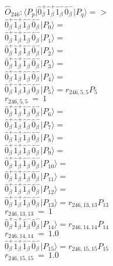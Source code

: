 \documentclass[14pt]{article}
\begin{document}
    $\hat{O}_{246}:  \langle{P_p}\vert \hat{0}_{\beta}^{+}\hat{1}_{\beta}^{+}\hat{1}_{\beta}^{-}\hat{0}_{\beta}^{-} \vert{P_q}\rangle => $ \\ 
    $ \hat{0}_{\beta}^{+}\hat{1}_{\beta}^{+}\hat{1}_{\beta}^{-}\hat{0}_{\beta}^{-} \vert{P_{0}}\rangle =  $ \\ 
    $ \hat{0}_{\beta}^{+}\hat{1}_{\beta}^{+}\hat{1}_{\beta}^{-}\hat{0}_{\beta}^{-} \vert{P_{1}}\rangle =  $ \\ 
    $ \hat{0}_{\beta}^{+}\hat{1}_{\beta}^{+}\hat{1}_{\beta}^{-}\hat{0}_{\beta}^{-} \vert{P_{2}}\rangle =  $ \\ 
    $ \hat{0}_{\beta}^{+}\hat{1}_{\beta}^{+}\hat{1}_{\beta}^{-}\hat{0}_{\beta}^{-} \vert{P_{3}}\rangle =  $ \\ 
    $ \hat{0}_{\beta}^{+}\hat{1}_{\beta}^{+}\hat{1}_{\beta}^{-}\hat{0}_{\beta}^{-} \vert{P_{4}}\rangle =  $ \\ 
    $ \hat{0}_{\beta}^{+}\hat{1}_{\beta}^{+}\hat{1}_{\beta}^{-}\hat{0}_{\beta}^{-} \vert{P_{5}}\rangle = {r}_{246,5,5}P_{5} $ \\ 
    ${r}_{246,5,5}\ =\ 1 $ \\ 
    $ \hat{0}_{\beta}^{+}\hat{1}_{\beta}^{+}\hat{1}_{\beta}^{-}\hat{0}_{\beta}^{-} \vert{P_{6}}\rangle =  $ \\ 
    $ \hat{0}_{\beta}^{+}\hat{1}_{\beta}^{+}\hat{1}_{\beta}^{-}\hat{0}_{\beta}^{-} \vert{P_{7}}\rangle =  $ \\ 
    $ \hat{0}_{\beta}^{+}\hat{1}_{\beta}^{+}\hat{1}_{\beta}^{-}\hat{0}_{\beta}^{-} \vert{P_{8}}\rangle =  $ \\ 
    $ \hat{0}_{\beta}^{+}\hat{1}_{\beta}^{+}\hat{1}_{\beta}^{-}\hat{0}_{\beta}^{-} \vert{P_{9}}\rangle =  $ \\ 
    $ \hat{0}_{\beta}^{+}\hat{1}_{\beta}^{+}\hat{1}_{\beta}^{-}\hat{0}_{\beta}^{-} \vert{P_{10}}\rangle =  $ \\ 
    $ \hat{0}_{\beta}^{+}\hat{1}_{\beta}^{+}\hat{1}_{\beta}^{-}\hat{0}_{\beta}^{-} \vert{P_{11}}\rangle =  $ \\ 
    $ \hat{0}_{\beta}^{+}\hat{1}_{\beta}^{+}\hat{1}_{\beta}^{-}\hat{0}_{\beta}^{-} \vert{P_{12}}\rangle =  $ \\ 
    $ \hat{0}_{\beta}^{+}\hat{1}_{\beta}^{+}\hat{1}_{\beta}^{-}\hat{0}_{\beta}^{-} \vert{P_{13}}\rangle = {r}_{246,13,13}P_{13} $ \\ 
    ${r}_{246,13,13}\ =\ 1 $ \\ 
    $ \hat{0}_{\beta}^{+}\hat{1}_{\beta}^{+}\hat{1}_{\beta}^{-}\hat{0}_{\beta}^{-} \vert{P_{14}}\rangle = {r}_{246,14,14}P_{14} $ \\ 
    ${r}_{246,14,14}\ =\ 1.0 $ \\ 
    $ \hat{0}_{\beta}^{+}\hat{1}_{\beta}^{+}\hat{1}_{\beta}^{-}\hat{0}_{\beta}^{-} \vert{P_{15}}\rangle = {r}_{246,15,15}P_{15} $ \\ 
    ${r}_{246,15,15}\ =\ 1.0 $ \\ 
    
\end{document}
